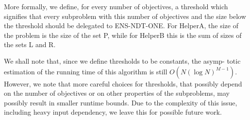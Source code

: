 More formally, we define, for every number of objectives, a threshold which signifies that every subproblem with this number of objectives and the size below the threshold should be delegated to ENS-NDT-ONE. For HelperA, the size of the problem is the size of the set P, while for HelperB this is the sum of sizes of the sets L and R.

We shall note that, since we define thresholds to be constants, the asymp- totic estimation of the running time of this algorithm is still $O(N(\log N)^{M-1})$. However, we note that more careful choices for thresholds, that possibly depend on the number of objectives or on other properties of the subproblems, may possibly result in smaller runtime bounds. Due to the complexity of this issue, including heavy input dependency, we leave this for possible future work.


